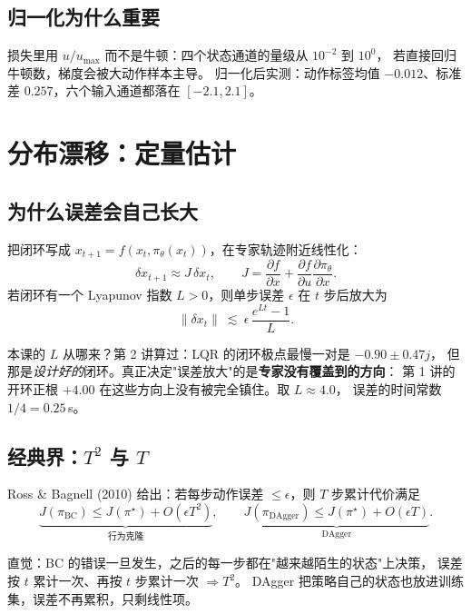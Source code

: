 \subsection{归一化为什么重要}

损失里用 $u/u_{\max}$ 而不是牛顿：四个状态通道的量级从 $10^{-2}$ 到 $10^{0}$，
若直接回归牛顿数，梯度会被大动作样本主导。
归一化后实测：动作标签均值 $-0.012$、标准差 $0.257$，六个输入通道都落在 $[-2.1,2.1]$。

\section{分布漂移：定量估计}

\subsection{为什么误差会自己长大}

把闭环写成 $x_{t+1}=f(x_t,\pi_\theta(x_t))$，在专家轨迹附近线性化：
\begin{equation}
  \delta x_{t+1}\approx J\,\delta x_t,\qquad
  J=\frac{\partial f}{\partial x}+\frac{\partial f}{\partial u}\frac{\partial \pi_\theta}{\partial x}.
\end{equation}
若闭环有一个 Lyapunov 指数 $L>0$，则单步误差 $\epsilon$ 在 $t$ 步后放大为
\begin{equation}
  \|\delta x_t\|\ \lesssim\ \epsilon\,\frac{e^{Lt}-1}{L}.
  \label{eq:exp}
\end{equation}

本课的 $L$ 从哪来？第 2 讲算过：LQR 的闭环极点最慢一对是 $-0.90\pm0.47j$，
但那是\emph{设计好的}闭环。真正决定"误差放大"的是\textbf{专家没有覆盖到的方向}：
第 1 讲的开环正根 $+4.00$ 在这些方向上没有被完全镇住。取 $L\approx4.0$，
误差的时间常数 $1/4=0.25$\,s。

\subsection{经典界：$T^2$ 与 $T$}

Ross \& Bagnell (2010) 给出：若每步动作误差 $\le\epsilon$，则 $T$ 步累计代价满足
\begin{equation}
  \underbrace{J(\pi_{\text{BC}})\le J(\pi^\star)+O(\epsilon T^2)}_{\text{行为克隆}},
  \qquad
  \underbrace{J(\pi_{\text{DAgger}})\le J(\pi^\star)+O(\epsilon T)}_{\text{DAgger}}.
  \label{eq:regret}
\end{equation}

直觉：BC 的错误一旦发生，之后的每一步都在"越来越陌生的状态"上决策，
误差按 $t$ 累计一次、再按 $t$ 步累计一次 $\Rightarrow T^2$。
DAgger 把策略自己的状态也放进训练集，误差不再累积，只剩线性项。

